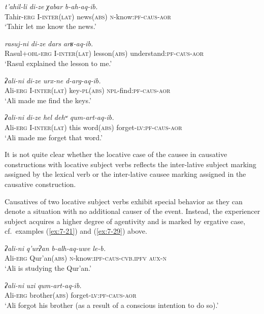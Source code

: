 ﻿\documentclass[output=paper]{langsci/langscibook}
\begin{document}
\ex %
\gll \emph{t'ahil-li} \emph{di-ze} \emph{χabar} \emph{b-ah-aq-ib.}\\
Tahir-\textsc{erg} I-\textsc{inter(lat)} news(\textsc{abs}) \textsc{n}-know:\textsc{pf}-\textsc{caus}-\textsc{aor}\\
\glt `Tahir let me know the news.'

\ex %
\gll \emph{rasuj-ni} \emph{di-ze} \emph{dars} \emph{arʁ-aq-ib.}\\ 
Rasul+\textsc{obl}-\textsc{erg} I-\textsc{inter(lat)} lesson(\textsc{abs}) understand:\textsc{pf}-\textsc{caus}-\textsc{aor}\\
\glt `Rasul explained the lesson to me.'

\ex %
\gll \emph{ʡali-ni} \emph{di-ze} \emph{urx-ne} \emph{d-arg-aq-ib.}\\ 
Ali-\textsc{erg} I-\textsc{inter(lat)} key-\textsc{pl}(\textsc{abs}) \textsc{npl}-find:\textsc{pf}-\textsc{caus}-\textsc{aor}\\
\glt `Ali made me find the keys.'

\ex %
\gll \emph{ʡali-ni} \emph{di-ze} \emph{hel} \emph{dehʷ} \emph{qum-art-aq-ib.}\\
Ali-\textsc{erg} I-\textsc{inter(lat)} {this} word(\textsc{abs}) forget-\textsc{lv}:\textsc{pf}-\textsc{caus}-\textsc{aor}\\
\glt `Ali made me forget that word.'
\z

It is not quite clear whether the locative case of the causee in
causative constructions with locative subject verbs reflects the
inter-lative subject marking assigned by the lexical verb or the
inter-lative causee marking assigned in the causative construction.

Causatives of two locative subject verbs exhibit special behavior as
they can denote a situation with no additional causer of the event.
Instead, the experiencer subject acquires a higher degree of agentivity
and is marked by ergative case, cf.\ examples (\ref{ex:7-21}) and (\ref{ex:7-29}) above.

\ea %
\gll \emph{ʡali-ni} \emph{q'urʔan} \emph{b-alh-aq-uwe} \emph{le-b.}\\
Ali-\textsc{erg} Qur'an(\textsc{abs}) \textsc{n}-know:\textsc{ipf}-\textsc{caus}-\textsc{cvb.ipfv} \textsc{aux}-\textsc{n}\\
\glt `Ali is studying the Qur'an.'

\ex %
\gll \emph{ʡali-ni} \emph{uzi} \emph{qum-art-aq-ib.}\\
Ali-\textsc{erg} brother(\textsc{abs}) forget-\textsc{lv}:\textsc{pf}-\textsc{caus}-\textsc{aor}\\
\glt `Ali forgot his brother (as a result of a conscious intention to do
so).'
\z
\end{document}
